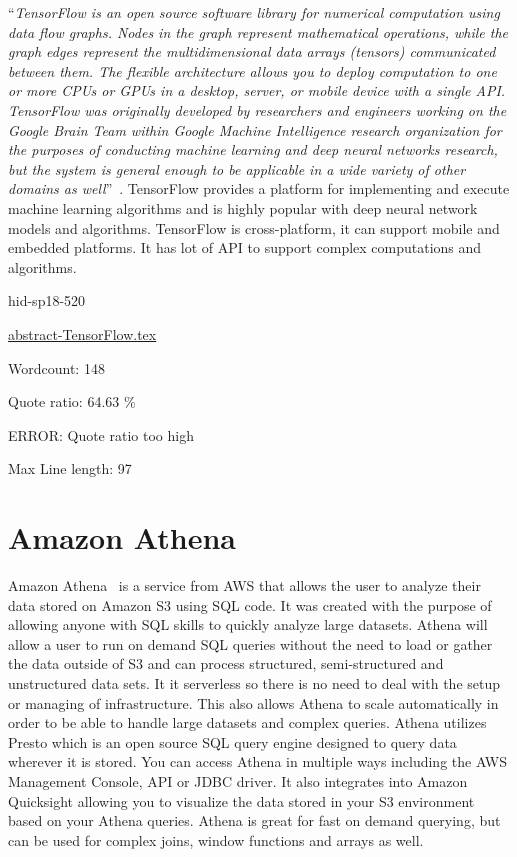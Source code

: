 \color{blue}``\emph{TensorFlow is an open source software library for numerical computation using
data flow graphs. Nodes in the graph represent mathematical operations, while the 
graph edges represent the multidimensional data arrays (tensors) communicated 
between them. The flexible architecture allows you to deploy computation to one 
or more CPUs or GPUs in a desktop, server, or mobile device with a single API. 
TensorFlow was originally developed by researchers and engineers working on the 
Google Brain Team within Google Machine Intelligence research organization for 
the purposes of conducting machine learning and deep neural networks research, 
but the system is general enough to be applicable in a wide variety of other 
domains as well}''\color{black}~\cite{hid-sp18-520-TensorFlow}.
TensorFlow provides a platform for implementing and execute machine learning
algorithms and is highly popular with deep neural network models and algorithms.
TensorFlow is cross-platform, it can support mobile and embedded platforms. It has
lot of API to support complex computations and algorithms.


\begin{IU}

hid-sp18-520

\href{https://github.com/cloudmesh-community/hid-sp18-520/blob/master//technology/abstract-TensorFlow.tex}{abstract-TensorFlow.tex}

 

Wordcount: 148


Quote ratio: 64.63 \%

ERROR: Quote ratio too high
 
Max Line length: 97
\end{IU}

\section{Amazon Athena}

Amazon Athena~\cite{hid-sp18-521-athena-faq} is a service from AWS that
allows the user to analyze their data stored on Amazon S3 using SQL code. 
It was created with the purpose of allowing anyone with SQL skills 
to quickly analyze large datasets. Athena will allow a user to run 
on demand SQL queries without the need to load or gather the data 
outside of S3 and can process structured, semi-structured and 
unstructured data sets. It it serverless so there is no need to 
deal with the setup or managing of infrastructure. This also allows
Athena to scale automatically in order to be able to handle large datasets
and complex queries. Athena utilizes Presto which is an open source SQL query
engine designed to query data wherever it is stored. You can access
Athena in multiple ways including the AWS Management Console, API or
JDBC driver. It also integrates into Amazon Quicksight allowing you
to visualize the data stored in your S3 environment based on your
Athena queries. Athena is great for fast on demand querying, but can
be used for complex joins, window functions and arrays as well.


